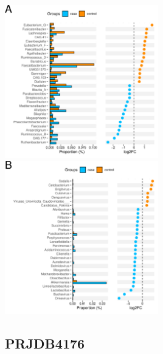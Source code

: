 \documentclass[
]{article}
\begin{document}
\includegraphics[width=0.5\textwidth,height=0.5\textheight]{../../Analysis_shotgun_ERP012177/04_Wilcoxon/atlas/output/class_ERP012177_pvalue0.05case_control_metagenomics.png}
\includegraphics[width=0.5\textwidth,height=0.5\textheight]{../../Analysis_shotgun_ERP012177/04_Wilcoxon/Kraken2/output/class_ERP012177_pvalue0.05case_control_metagenomics.png}

\hypertarget{prjdb4176-1}{%
\subsection{PRJDB4176}\label{prjdb4176-1}}
\end{document}
